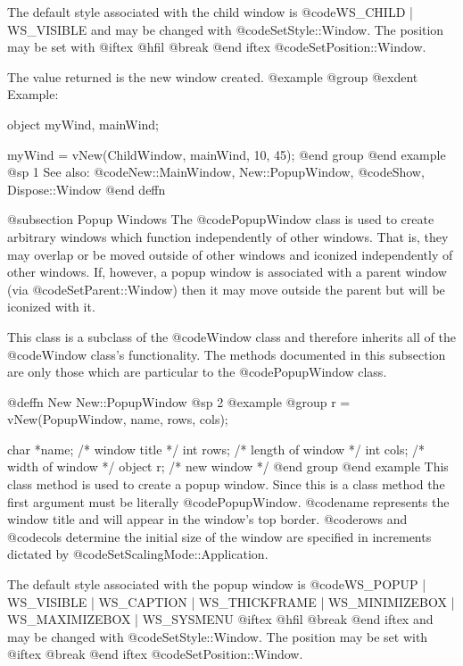 The default style associated with the child window is
@code{WS_CHILD | WS_VISIBLE} and may be changed with @code{SetStyle::Window}.
The position may be set with 
@iftex
@hfil @break 
@end iftex
@code{SetPosition::Window}.

The value returned is the new window created.
@example
@group
@exdent Example:

object  myWind, mainWind;

myWind = vNew(ChildWindow, mainWind, 10, 45);
@end group
@end example
@sp 1
See also:  @code{New::MainWindow, New::PopupWindow,}
      @code{Show, Dispose::Window}
@end deffn








@subsection Popup Windows
The @code{PopupWindow} class is used to create arbitrary windows which
function independently of other windows.  That is, they may overlap or
be moved outside of other windows and iconized independently of other
windows.  If, however, a popup window is associated with a parent window
(via @code{SetParent::Window}) then it may move outside the parent but
will be iconized with it.

This class is a subclass of the @code{Window} class and therefore
inherits all of the @code{Window} class's functionality.  The methods
documented in this subsection are only those which are particular
to the @code{PopupWindow} class.






@deffn {New} New::PopupWindow
@sp 2
@example
@group
r = vNew(PopupWindow, name, rows, cols);

char    *name;  /*  window title      */
int     rows;   /*  length of window  */
int     cols;   /*  width of window   */
object  r;      /*  new window        */
@end group
@end example
This class method is used to create a popup window.  Since this is a
class method the first argument must be literally @code{PopupWindow}.
@code{name} represents the window title and will appear in the window's
top border.  @code{rows} and @code{cols} determine the initial size of
the window are specified in increments dictated by
@code{SetScalingMode::Application}.

The default style associated with the popup window is @code{WS_POPUP |
WS_VISIBLE | WS_CAPTION | WS_THICKFRAME | WS_MINIMIZEBOX |
WS_MAXIMIZEBOX | WS_SYSMENU} 
@iftex
@hfil @break 
@end iftex
and may be changed with
@code{SetStyle::Window}.  The position may be set with
@iftex
@break 
@end iftex
@code{SetPosition::Window}.

